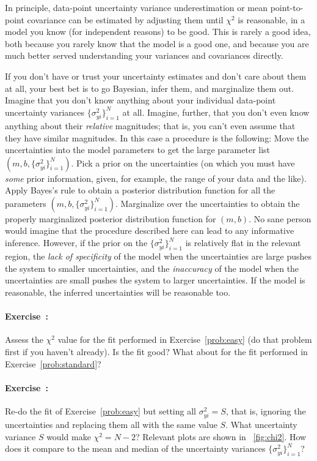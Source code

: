 \documentclass[12pt,twoside,pdftex]{article}
\newcommand{\problemname}{Exercise}
\newcounter{problem}
\newenvironment{problem}{\paragraph{\problemname~\theproblem:}\refstepcounter{problem}}{}
\newcommand{\setofall}[3]{\{{#1}\}_{{#2}}^{{#3}}}
\newcommand{\allsigmay}{\setofall{\sigma_{yi}^2}{i=1}{N}}
\begin{document}
In principle, data-point uncertainty variance underestimation or mean
point-to-point covariance can be estimated by adjusting them until
$\chi^2$ is reasonable, in a model you know (for independent reasons)
to be good.  This is rarely a good idea, both because you rarely know
that the model is a good one, and because you are much better served
understanding your variances and covariances directly.

If you don't have or trust your uncertainty estimates and don't care
about them at all, your best bet is to go Bayesian, infer them, and
marginalize them out.  Imagine that you don't know anything about your
individual data-point uncertainty variances $\allsigmay$ at all.
Imagine, further, that you don't even know anything about their
\emph{relative} magnitudes; that is, you can't even assume that they
have similar magnitudes.  In this case a procedure is the following:
Move the uncertainties into the model parameters to get the large
parameter list $(m,b,\allsigmay)$.  Pick a prior on the uncertainties
(on which you must have \emph{some} prior information, given, for
example, the range of your data and the like).  Apply Bayes's rule to
obtain a posterior distribution function for all the parameters
$(m,b,\allsigmay)$.  Marginalize over the uncertainties to obtain the
properly marginalized posterior distribution function for $(m,b)$.  No
sane person would imagine that the procedure described here can lead
to any informative inference.  However, if the prior on the
$\allsigmay$ is relatively flat in the relevant region, the \emph{lack
  of specificity} of the model when the uncertainties are large pushes
the system to smaller uncertainties, and the \emph{inaccuracy} of the
model when the uncertainties are small pushes the system to larger
uncertainties.  If the model is reasonable, the inferred uncertainties
will be reasonable too.

\begin{problem}
Assess the $\chi^2$ value for the fit performed in
\problemname~\ref{prob:easy} (do that problem first if you haven't
already).  Is the fit good?  What about for the fit performed in
\problemname~\ref{prob:standard}?
\end{problem}

\begin{problem}\label{prob:chi2}
Re-do the fit of \problemname~\ref{prob:easy} but setting all
$\sigma_{yi}^2=S$, that is, ignoring the uncertainties and replacing
them all with the same value $S$.  What uncertainty variance $S$ would
make $\chi^2 = N-2$?  Relevant plots are shown in
\figurename~\ref{fig:chi2}.  How does it compare to the mean and
median of the uncertainty variances $\allsigmay$?
\end{problem}
\end{document}
